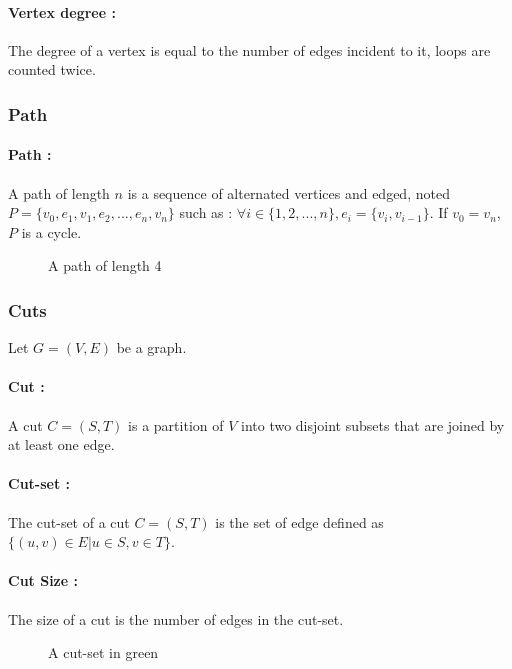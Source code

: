 \paragraph{Vertex degree :}
The degree of a vertex is equal to the number of edges incident to it, loops
are counted twice.

\subsubsection{Path}
\paragraph{Path :}
A path of length $n$ is a sequence of alternated vertices and edged, noted
$P = \{v_0, e_1, v_1, e_2, ..., e_n, v_n\}$ such as :
$\forall i \in \{1,2, ..., n\}, e_i = \{v_i, v_{i-1}\}$. If $v_0 = v_n$, $P$ is
a cycle.

\begin{figure}[!h]
  \begin{center}
    
  \end{center}
  \caption{A path of length 4}
\end{figure}

\subsubsection{Cuts}
Let $G=(V,E)$ be a graph.
\paragraph{Cut :}
A cut $C=(S,T)$ is a partition of $V$ into two disjoint subsets that are joined by at least one edge.

\paragraph{Cut-set :}
The cut-set of a cut $C=(S,T)$ is the set of edge defined as $\{(u,v)\in E | u\in S, v \in T\}$.

\paragraph{Cut Size :}
The size of a cut is the number of edges in the cut-set.


\begin{figure}[!h]
  \begin{center}
    
  \end{center}
  \caption{A cut-set in green}
\end{figure}

